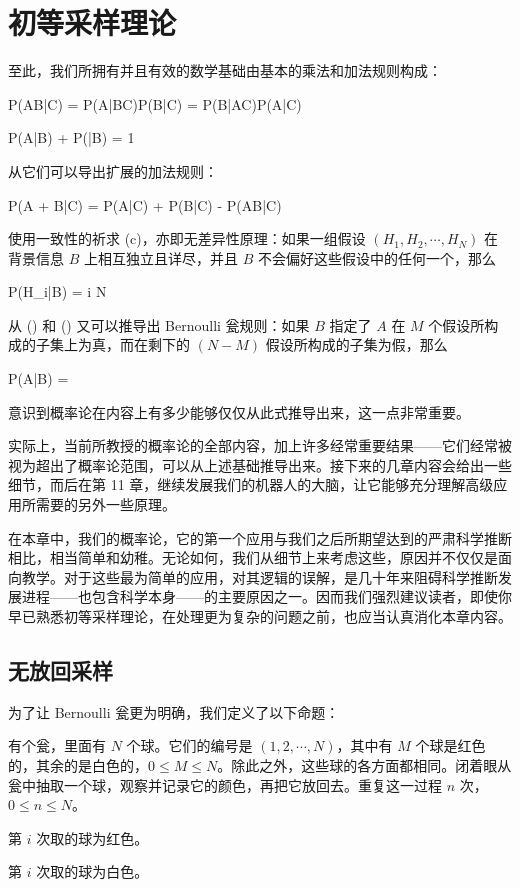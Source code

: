 \chapter[quantitative-rules]{初等采样理论}

至此，我们所拥有并且有效的数学基础由基本的乘法和加法规则构成：

\placeformula[3-1]
\startformula
P(AB|C) = P(A|BC)P(B|C) = P(B|AC)P(A|C)
\stopformula

\placeformula[3-2]
\startformula
P(A|B) + P(|B) = 1
\stopformula

从它们可以导出扩展的加法规则：

\placeformula[3-3]
\startformula
P(A + B|C) = P(A|C) + P(B|C) - P(AB|C)
\stopformula

使用一致性的祈求 (c)，亦即无差异性原理：如果一组假设 $(H_1,H_2,\cdots,H_N)$ 在背景信息 $B$ 上相互独立且详尽，并且 $B$ 不会偏好这些假设中的任何一个，那么

\placeformula[3-4]
\startformula
P(H_i|B) = \quad{}\le i \le N
\stopformula

从 (\in[3-3]) 和 (\in[3-4]) 又可以推导出 Bernoulli 瓮规则：如果 $B$ 指定了 $A$ 在 $M$ 个假设所构成的子集上为真，而在剩下的 $(N - M)$ 假设所构成的子集为假，那么

\placeformula[3-5]
\startformula
P(A|B) = 
\stopformula

意识到概率论在内容上有多少能够仅仅从此式推导出来，这一点非常重要。

实际上，当前所教授的概率论的全部内容，加上许多经常重要结果——它们经常被视为超出了概率论范围，可以从上述基础推导出来。接下来的几章内容会给出一些细节，而后在第 11 章，继续发展我们的机器人的大脑，让它能够充分理解高级应用所需要的另外一些原理。

在本章中，我们的概率论，它的第一个应用与我们之后所期望达到的严肃科学推断相比，相当简单和幼稚。无论如何，我们从细节上来考虑这些，原因并不仅仅是面向教学。对于这些最为简单的应用，对其逻辑的误解，是几十年来阻碍科学推断发展进程——也包含科学本身——的主要原因之一。因而我们强烈建议读者，即使你早已熟悉初等采样理论，在处理更为复杂的问题之前，也应当认真消化本章内容。

\section[sec-3-1]{无放回采样}

为了让 Bernoulli 瓮更为明确，我们定义了以下命题：

 有个瓮，里面有 $N$ 个球。它们的编号是 $(1,2,\cdots,N)$，其中有 $M$ 个球是红色的，其余的是白色的，$0\le M \le N$。除此之外，这些球的各方面都相同。闭着眼从瓮中抽取一个球，观察并记录它的颜色，再把它放回去。重复这一过程 $n$ 次，$0\le n \le N$。\par
{} 第 $i$ 次取的球为红色。\par
{} 第 $i$ 次取的球为白色。\par

